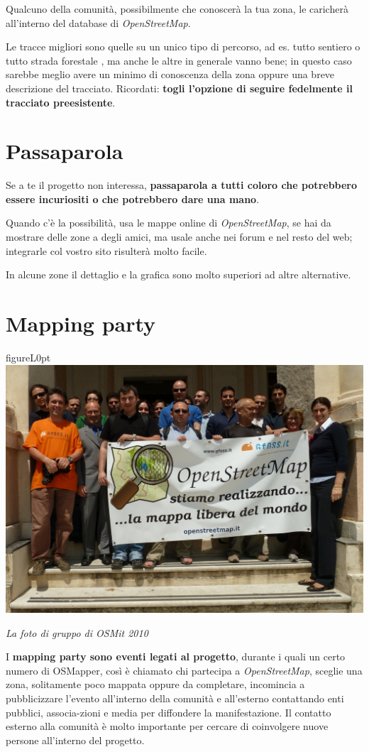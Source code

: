 \documentclass[a4paper,twoside,12pt,]{article}
\newcommand{\osm}{\emph{OpenStreetMap}\xspace}
\begin{document}
Qualcuno della comunità, possibilmente che conoscerà la tua zona, le caricherà all'interno del database di \osm.

Le tracce migliori sono quelle su un unico tipo di percorso, ad es. tutto sentiero o tutto strada forestale , ma anche le altre in generale vanno bene; in questo caso sarebbe meglio avere un minimo di conoscenza della zona oppure una breve descrizione del tracciato. Ricordati: \textbf{togli l'opzione di seguire fedelmente il tracciato preesistente}.
\section{Passaparola}
Se a te il progetto non interessa, \textbf{passaparola a tutti coloro che potrebbero essere incuriositi o che potrebbero dare una mano}.

Quando c'è la possibilità, usa le mappe online di \osm, se hai da mostrare delle zone a degli amici, ma usale anche nei forum e nel resto del web; integrarle col vostro sito risulterà molto facile. %
 
In alcune zone il dettaglio e la grafica sono molto superiori ad altre alternative.
\section{Mapping party}
\begin{wrapfloat}{figure}{L}{0pt}
 \includegraphics[width=0.55\columnwidth]{Osmit2010.JPG}
 \caption{\small{\textit{La foto di gruppo di OSMit 2010}}}
\end{wrapfloat}
I \textbf{mapping party sono eventi legati al progetto}, durante i quali un certo numero di OSMapper, così è chiamato chi partecipa a \osm, sceglie una zona, solitamente poco mappata oppure da completare, incomincia a pubblicizzare l'evento all'interno della comunità e all'esterno contattando enti pubblici, associa-zioni e media per diffondere la manifestazione. Il contatto esterno alla comunità è molto importante per cercare di coinvolgere nuove persone all'interno del progetto.
\end{document}
